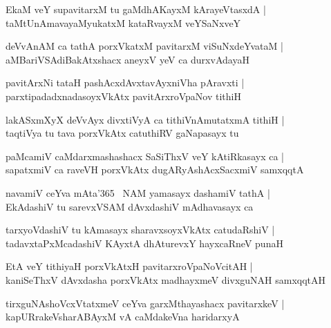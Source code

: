 \documentclass[twoside,12pt,openright]{book}
\newcounter{shloka}[chapter]
\begin{document}
\begin{shloka}%
EkaM veY supavitarxM tu gaMdhAKayxM kArayeVtasxdA |\\
taMtUnAmavayaMyukatxM kataRvayxM veYSaNxveY
\end{shloka}

\begin{shloka}%
deVvAnAM ca tathA porxVkatxM pavitarxM viSuNxdeYvataM |\\
aMBariVSAdiBakAtxshacx aneyxV yeV ca durxvAdayaH 
\end{shloka}

\begin{shloka}%
pavitArxNi tataH pashAcxdAvxtavAyxniVha pAravxti |\\
parxtipadadxnadasoyxVkAtx pavitArxroVpaNov tithiH 
\end{shloka}

\begin{shloka}%
lakASxmXyX deVvAyx divxtiVyA ca tithiVnAmutatxmA tithiH |\\
taqtiVya tu tava porxVkAtx catuthiRV gaNapasayx tu
\end{shloka}

\begin{shloka}%
paMcamiV caMdarxmashashacx SaSiThxV veY kAtiRkasayx ca |\\
sapatxmiV ca raveVH porxVkAtx dugARyAshAcxSacxmiV samxqqtA
\end{shloka}

\begin{shloka}%
navamiV ceYva mAta\char'365 ~NAM yamasayx dashamiV tathA |\\
EkAdashiV tu sarevxVSAM dAvxdashiV mAdhavasayx ca 
\end{shloka}

\begin{shloka}%
tarxyoVdashiV tu kAmasayx sharavxsoyxVkAtx catudaRshiV |\\
tadavxtaPxMcadashiV KAyxtA dhAturevxY hayxcaRneV punaH 
\end{shloka}

\begin{shloka}%
EtA veY tithiyaH porxVkAtxH pavitarxroVpaNoVcitAH |\\
kaniSeThxV dAvxdasha porxVkAtx madhayxmeV divxguNAH samxqqtAH 
\end{shloka}

\begin{shloka}%
tirxguNAshoVcxVtatxmeV ceYva garxMthayashacx pavitarxkeV |\\
kapURrakeVsharABAyxM vA caMdakeVna haridarxyA 
\end{shloka}
\end{document}
